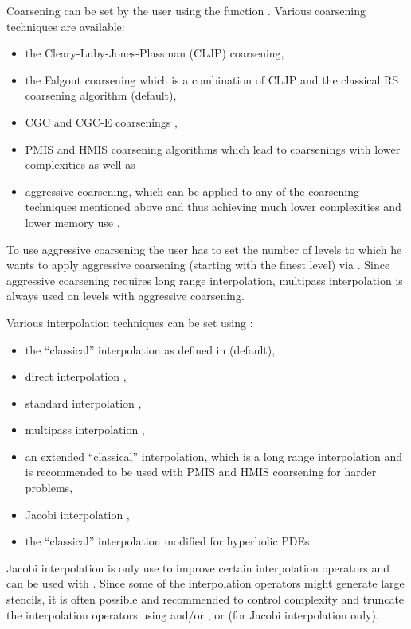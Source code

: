 Coarsening can be set by the user using the function .
Various coarsening techniques are available:
\begin{itemize}
\item the Cleary-Luby-Jones-Plassman (CLJP) coarsening,
\item the Falgout coarsening which is a combination of CLJP and the
classical RS coarsening algorithm (default),
\item CGC and CGC-E coarsenings \cite{Griebela_1, Griebel_2},
\item PMIS and HMIS coarsening algorithms which lead to coarsenings with lower complexities \cite{DeSterck_Yang_Heys_2004}
as well as
\item aggressive coarsening, which can be applied to any of the coarsening techniques mentioned above and thus achieving much lower complexities and lower memory use \cite{Stueben_1999}.
\end{itemize}
To use aggressive coarsening the user has to set the number of levels to which he wants to apply
aggressive coarsening (starting with the finest level) 
via . Since aggressive coarsening requires long range
interpolation, multipass interpolation is always used on levels with aggressive coarsening.

Various interpolation techniques can be set using :
\begin{itemize}
\item the ``classical'' interpolation as defined in \cite{Ruge_Stueben_1987} (default),
\item direct interpolation \cite{Stueben_1999},
\item standard interpolation \cite{Stueben_1999},
\item multipass interpolation \cite{Stueben_1999},
\item an extended ``classical'' interpolation, which is a long range interpolation and is recommended to be used with PMIS and HMIS coarsening for harder problems,
\item Jacobi interpolation \cite{Stueben_1999},
\item the ``classical'' interpolation modified for hyperbolic PDEs.
\end{itemize}
Jacobi interpolation is only use to improve certain interpolation operators and can be 
used with .
Since some of the interpolation operators might generate large stencils, it is often possible 
and recommended to control complexity and truncate the interpolation operators
using  and/or ,
or  (for Jacobi interpolation only).

